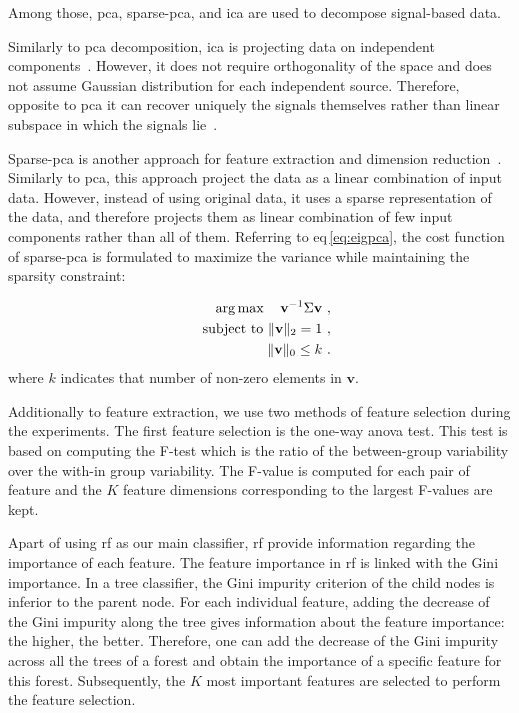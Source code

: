 Among those, \ac{pca}, sparse-\ac{pca}, and \ac{ica} are used to decompose signal-based data.

Similarly to \ac{pca} decomposition, \ac{ica} is projecting data on independent components~\cite{comon1994independent}.
However, it does not require orthogonality of the space and does not assume Gaussian distribution for each independent source.
Therefore, opposite to \ac{pca} it can recover uniquely the signals themselves rather than linear subspace in which the signals lie~\cite{murphy2012machine}.

Sparse-\ac{pca} is another approach for feature extraction and dimension reduction~\cite{zou2006sparse}.
Similarly to \ac{pca}, this approach project the data as a linear combination of input data.
However, instead of using original data, it uses a sparse representation of the data, and therefore projects them as linear combination of few input components rather than all of them.
Referring to \acs{eq}\,\eqref{eq:eigpca}, the cost function of sparse-\ac{pca} is formulated to maximize the variance while maintaining the sparsity constraint:

\begin{eqnarray}
 && \operatorname*{arg\,max} \quad   \mathbf{v}^{-1} \Sigma \mathbf{v}\ , \label{eq:sparsepca}\\ 
 && \text{subject to }  \Vert \mathbf{v} \Vert_{2} = 1\ , \nonumber \\
 && \Vert \mathbf{v} \Vert_{0} \leq k\ . \nonumber
\end{eqnarray}
\noindent where $k$ indicates that number of non-zero elements in $\mathbf{v}$.

Additionally to feature extraction, we use two methods of feature selection during the experiments.
The first feature selection is the one-way \ac{anova} test.
This test is based on computing the F-test which is the ratio of the between-group variability over the with-in group variability.
The F-value is computed for each pair of feature and the $K$ feature dimensions corresponding to the largest F-values are kept.

Apart of using \ac{rf} as our main classifier, \ac{rf} provide information regarding the importance of each feature.
The feature importance in \ac{rf} is linked with the Gini importance.
In a tree classifier, the Gini impurity criterion of the child nodes is inferior to the parent node.
For each individual feature, adding the decrease of the Gini impurity along the tree gives information about the feature importance: the higher, the better.
Therefore, one can add the decrease of the Gini impurity across all the trees of a forest and obtain the importance of a specific feature for this forest.
Subsequently, the $K$ most important features are selected to perform the feature selection.


